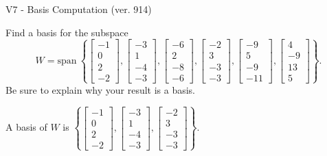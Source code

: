 \begin{exercise}
  \begin{exerciseTitle}V7 - Basis Computation (ver. 914)\end{exerciseTitle}
  \begin{exerciseStatement}
    Find a basis for the subspace 
\[W=\mathrm{span}\ \left\{\left[\begin{array}{r}
-1 \\
0 \\
2 \\
-2
\end{array}\right] , \left[\begin{array}{r}
-3 \\
1 \\
-4 \\
-3
\end{array}\right] , \left[\begin{array}{r}
-6 \\
2 \\
-8 \\
-6
\end{array}\right] , \left[\begin{array}{r}
-2 \\
3 \\
-3 \\
-3
\end{array}\right] , \left[\begin{array}{r}
-9 \\
5 \\
-9 \\
-11
\end{array}\right] , \left[\begin{array}{r}
4 \\
-9 \\
13 \\
5
\end{array}\right]\right\}.\]
 Be sure to explain why your result is a basis.


  \end{exerciseStatement}
  \begin{exerciseAnswer}
   A basis of \(W\) is  \(\left\{\left[\begin{array}{r}
-1 \\
0 \\
2 \\
-2
\end{array}\right] , \left[\begin{array}{r}
-3 \\
1 \\
-4 \\
-3
\end{array}\right] , \left[\begin{array}{r}
-2 \\
3 \\
-3 \\
-3
\end{array}\right]\right\}\).
  


  \end{exerciseAnswer}
\end{exercise}